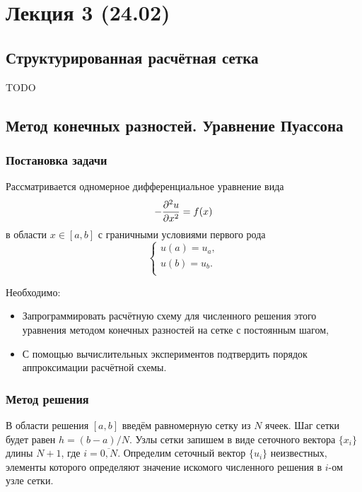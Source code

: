 \section{Лекция 3 (24.02)}
\subsection{Структурированная расчётная сетка}
TODO
\subsection{Метод конечных разностей. Уравнение Пуассона}

\subsubsection{Постановка задачи}
Рассматривается одномерное дифференциальное уравнение вида
\begin{equation}
    \label{eq:poisson1d}
    -\dfrac{\partial^2 u}{\partial x^2} = f(x)
\end{equation}
в области $x\in[a,b]$ с граничными условиями первого рода
\begin{equation}
	\label{eq:poisson1d_bc}
	\begin{cases}
        u(a)=u_a,\\[5pt]
        u(b)=u_b.\\
	\end{cases}
\end{equation}

Необходимо:
\begin{itemize}
\item 
	Запрограммировать расчётную схему для численного решения этого уравнения методом конечных разностей
	на сетке с постоянным шагом,
\item
	С помощью вычислительных экспериментов подтвердить порядок аппроксимации расчётной схемы.
\end{itemize}

\subsubsection{Метод решения}


В области решения $[a,b]$ введём равномерную сетку из $N$ ячеек.
Шаг сетки будет равен $h=(b-a)/N$.
Узлы сетки запишем в виде сеточного вектора $\{x_i\}$ длины $N+1$, где $i=\overline{0,N}$.
Определим сеточный вектор $\{u_i\}$ неизвестных, элементы которого определяют значение искомого численного решения в $i$-ом узле сетки. 

